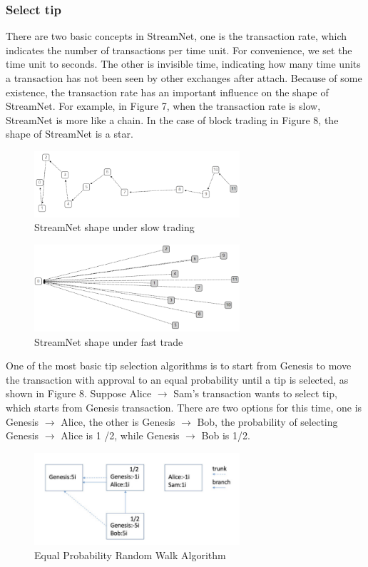 \subsubsection{Select tip}
There are two basic concepts in StreamNet, one is the transaction rate, which indicates the number of transactions per time unit. For convenience, we set the time unit to seconds. The other is invisible time, indicating how many time units a transaction has not been seen by other exchanges after attach. Because of some existence, the transaction rate has an important influence on the shape of StreamNet. For example, in Figure 7, when the transaction rate is slow, StreamNet is more like a chain. In the case of block trading in Figure 8, the shape of StreamNet is a star.

\begin{figure}[H]
	\centering
	\includegraphics[width=3.0in]{figures/screenshot006.png}
	\caption{StreamNet shape under slow trading}
	\label{simulationfigure}
\end{figure}

\begin{figure}[H]
	\centering
	\includegraphics[width=3.0in]{figures/screenshot007.png}
	\caption{StreamNet shape under fast trade}
	\label{simulationfigure}
\end{figure}

One of the most basic tip selection algorithms is to start from Genesis to move the transaction with approval to an equal probability until a tip is selected, as shown in Figure 8. Suppose Alice $\rightarrow$ Sam's transaction wants to select tip, which starts from Genesis transaction. There are two options for this time, one is Genesis $\rightarrow$ Alice, the other is Genesis $\rightarrow$ Bob, the probability of selecting Genesis $\rightarrow$ Alice is 1 /2, while Genesis $\rightarrow$ Bob is 1/2. 

\begin{figure}[H]
	\centering
	\includegraphics[width=3.0in]{figures/screenshot008.png}
	\caption{Equal Probability Random Walk Algorithm}
	\label{simulationfigure}
\end{figure}

